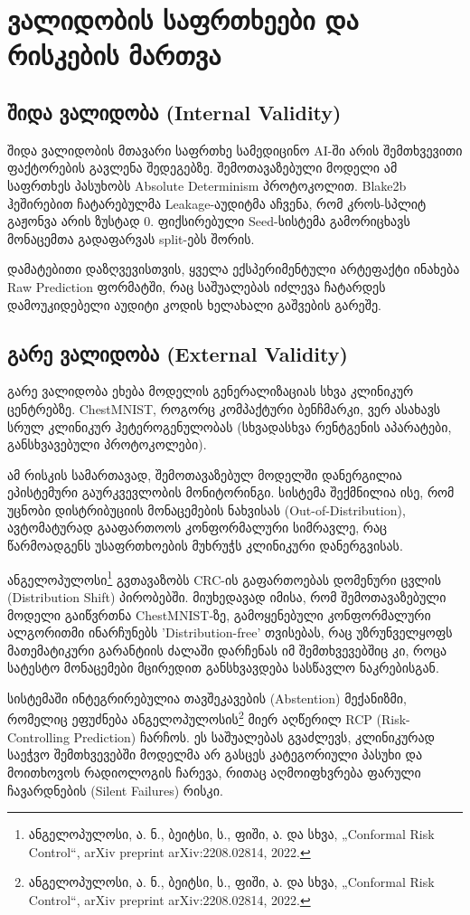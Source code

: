 \documentclass[12pt,a4paper,oneside]{report}
\begin{document}
\chapter{ვალიდობის საფრთხეები და რისკების მართვა}

\section{შიდა ვალიდობა (Internal Validity)}
შიდა ვალიდობის მთავარი საფრთხე სამედიცინო AI-ში არის შემთხვევითი ფაქტორების გავლენა შედეგებზე. შემოთავაზებული მოდელი ამ საფრთხეს პასუხობს Absolute Determinism პროტოკოლით. Blake2b ჰეშირებით ჩატარებულმა Leakage-აუდიტმა აჩვენა, რომ კროს-სპლიტ გაჟონვა არის ზუსტად 0. ფიქსირებული Seed-სისტემა გამორიცხავს მონაცემთა გადაფარვას split-ებს შორის. 

დამატებითი დაზღვევისთვის, ყველა ექსპერიმენტული არტეფაქტი ინახება Raw Prediction ფორმატში, რაც საშუალებას იძლევა ჩატარდეს დამოუკიდებელი აუდიტი კოდის ხელახალი გაშვების გარეშე.

\section{გარე ვალიდობა (External Validity)}
გარე ვალიდობა ეხება მოდელის გენერალიზაციას სხვა კლინიკურ ცენტრებზე. ChestMNIST, როგორც კომპაქტური ბენჩმარკი, ვერ ასახავს სრულ კლინიკურ ჰეტეროგენულობას (სხვადასხვა რენტგენის აპარატები, განსხვავებული პროტოკოლები). 

ამ რისკის სამართავად, შემოთავაზებულ მოდელში დანერგილია ეპისტემური გაურკვევლობის მონიტორინგი. სისტემა შექმნილია ისე, რომ უცნობი დისტრიბუციის მონაცემების ნახვისას (Out-of-Distribution), ავტომატურად გააფართოოს კონფორმალური სიმრავლე, რაც წარმოადგენს უსაფრთხოების მუხრუჭს კლინიკური დანერგვისას.

ანგელოპულოსი\footnote{ანგელოპულოსი, ა. ნ., ბეიტსი, ს., ფიში, ა. და სხვა, „Conformal Risk Control“, arXiv preprint arXiv:2208.02814, 2022.} გვთავაზობს CRC-ის გაფართოებას დომენური ცვლის (Distribution Shift) პირობებში. მიუხედავად იმისა, რომ შემოთავაზებული მოდელი გაიწვრთნა ChestMNIST-ზე, გამოყენებული კონფორმალური ალგორითმი ინარჩუნებს 'Distribution-free' თვისებას, რაც უზრუნველყოფს მათემატიკური გარანტიის ძალაში დარჩენას იმ შემთხვევებშიც კი, როცა სატესტო მონაცემები მცირედით განსხვავდება სასწავლო ნაკრებისგან.

სისტემაში ინტეგრირებულია თავშეკავების (Abstention) მექანიზმი, რომელიც ეფუძნება ანგელოპულოსის\footnote{ანგელოპულოსი, ა. ნ., ბეიტსი, ს., ფიში, ა. და სხვა, „Conformal Risk Control“, arXiv preprint arXiv:2208.02814, 2022.} მიერ აღწერილ RCP (Risk-Controlling Prediction) ჩარჩოს. ეს საშუალებას გვაძლევს, კლინიკურად საეჭვო შემთხვევებში მოდელმა არ გასცეს კატეგორიული პასუხი და მოითხოვოს რადიოლოგის ჩარევა, რითაც აღმოიფხვრება ფარული ჩავარდნების (Silent Failures) რისკი.
\end{document}
